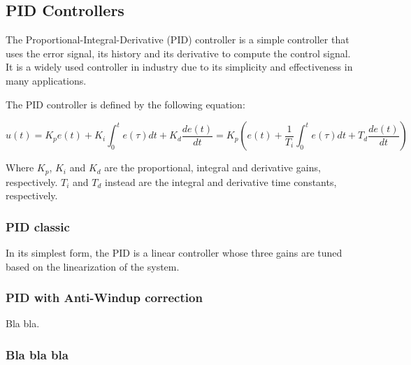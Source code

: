 \subsection{PID Controllers}
\label{subsec:pid_controllers}

The Proportional-Integral-Derivative (PID) controller is a simple controller that uses the error signal, its history and its derivative to compute the control signal.
It is a widely used controller in industry due to its simplicity and effectiveness in many applications.

The PID controller is defined by the following equation:

\begin{equation}
    u(t) = K_p e(t) + K_i \int_{0}^{t} e(\tau)dt + K_d \frac{de(t)}{dt} = K_p \left(e(t) + \frac{1}{T_i} \int_{0}^{t} e(\tau)dt + T_d \frac{de(t)}{dt}\right)
\end{equation}

Where $K_p$, $K_i$ and $K_d$ are the proportional, integral and derivative gains, respectively.
$T_i$ and $T_d$ instead are the integral and derivative time constants, respectively.


\subsubsection{PID classic}
\label{subsubsec:pid_classic}

In its simplest form, the PID is a linear controller whose three gains are tuned based on the linearization of the system.



\subsubsection{PID with Anti-Windup correction}
\label{subsubsec:pid_anti_windup}

Bla bla.

\subsubsection{Bla bla bla}
